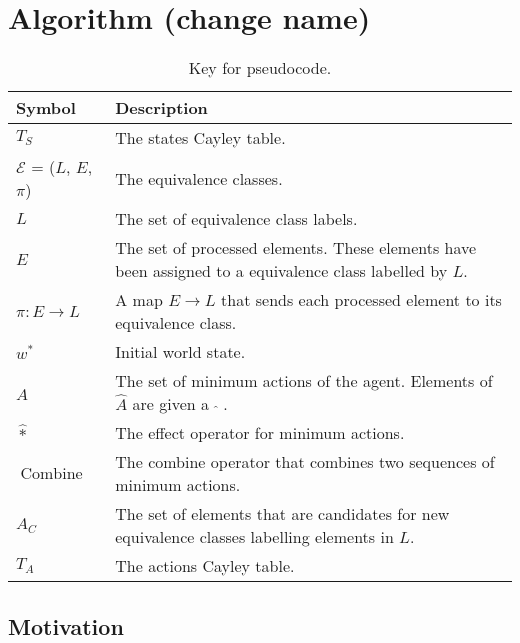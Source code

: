 \chapter{Algorithm (change name)}
\begin{table}[H]
\centering
\begin{tabularx}{\textwidth}{@{}lX@{}}
\toprule
\textbf{Symbol} & \textbf{Description} \\
\midrule
    $T_{S}$ & The states Cayley table. \\
    $\mathcal{E}$ = ($L$, \; $E$, \; $\pi$) & The equivalence classes. \\
    $L$ & The set of equivalence class labels. \\
    $E$ & The set of processed elements. These elements have been assigned to a equivalence class labelled by $L$. \\
    $\pi: E \to L$ & A map $E \to L$ that sends each processed element to its equivalence class. \\
    $w^{*}$ & Initial world state. \\
    $\hat{A}$ & The set of minimum actions of the agent. Elements of $\hat{A}$ are given a $\; \hat{ } \;$. \\
    $\hat{*}$ & The effect operator for minimum actions. \\
    $\operatorname{Combine}$ & The combine operator that combines two sequences of minimum actions. \\
    $A_{C}$ & The set of elements that are candidates for new equivalence classes labelling elements in $L$. \\
    $T_{A}$ & The actions Cayley table. \\
\bottomrule
\end{tabularx}
\caption{Key for pseudocode.}
\label{tab:pseudocode_key}
\end{table}



\section{Motivation}

